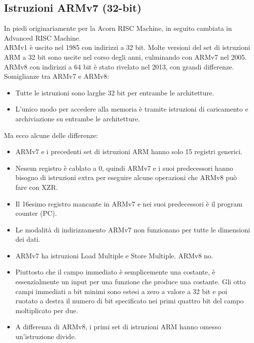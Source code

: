 \documentclass[12pt,a4paper]{article}
\begin{document}
\subsection{Istruzioni ARMv7 (32-bit)}
In piedi originariamente per la Acorn RISC Machine, in seguito cambiata in Advanced RISC Machine.\\
ARMv1 è uscito nel 1985 con indirizzi a 32 bit. Molte versioni del set di istruzioni ARM a 32 bit sono uscite nel corso degli anni, culminando con ARMv7 nel 2005.
ARMv8 con indirizzi a 64 bit è stato rivelato nel 2013, con grandi differenze.\\
Somiglianze tra ARMv7 e ARMv8:
\begin{itemize}
\item Tutte le istruzioni sono larghe 32 bit per entrambe le architetture.
\item L'unico modo per accedere alla memoria è tramite istruzioni di caricamento e archiviazione su entrambe le architetture.
\end{itemize}
Ma ecco alcune delle differenze:
\begin{itemize}
\item ARMv7 e i precedenti set di istruzioni ARM hanno solo 15 registri generici.
\item Nessun registro è cablato a 0, quindi ARMv7 e i suoi predecessori hanno bisogno di istruzioni extra per eseguire alcune operazioni che ARMv8 può fare con XZR.
\item Il 16esimo registro mancante in ARMv7 e nei suoi predecessori è il program counter (PC).
\item Le modalità di indirizzamento ARMv7 non funzionano per tutte le dimensioni dei dati.
\item ARMv7 ha istruzioni Load Multiple e Store Multiple. ARMv8 no.
\item Piuttosto che il campo immediato è semplicemente una costante, è essenzialmente un input per una funzione che produce una costante. Gli otto campi immediati a bit minimi sono estesi a zero a valore a 32 bit e poi ruotato a destra il numero di bit specificato nei primi quattro bit del campo moltiplicato per due.
\item A differenza di ARMv8, i primi set di istruzioni ARM hanno omesso un'istruzione divide.
\end{itemize}
\end{document}
